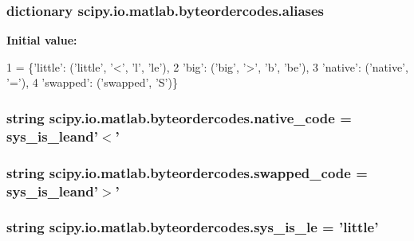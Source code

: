 \subsubsection[{aliases}]{\setlength{\rightskip}{0pt plus 5cm}dictionary scipy.\+io.\+matlab.\+byteordercodes.\+aliases}\label{namespacescipy_1_1io_1_1matlab_1_1byteordercodes_a910ab30880606690c14a385c87d8d3cb}
{\bfseries Initial value\+:}
\begin{DoxyCode}
1 = \{\textcolor{stringliteral}{'little'}: (\textcolor{stringliteral}{'little'}, \textcolor{stringliteral}{'<'}, \textcolor{stringliteral}{'l'}, \textcolor{stringliteral}{'le'}),
2            \textcolor{stringliteral}{'big'}: (\textcolor{stringliteral}{'big'}, \textcolor{stringliteral}{'>'}, \textcolor{stringliteral}{'b'}, \textcolor{stringliteral}{'be'}),
3            \textcolor{stringliteral}{'native'}: (\textcolor{stringliteral}{'native'}, \textcolor{stringliteral}{'='}),
4            \textcolor{stringliteral}{'swapped'}: (\textcolor{stringliteral}{'swapped'}, \textcolor{stringliteral}{'S'})\}
\end{DoxyCode}
\hypertarget{namespacescipy_1_1io_1_1matlab_1_1byteordercodes_a85c3d9d0b8f0e6a10e799dcfe42b2601}{}
\subsubsection[{native\+\_\+code}]{\setlength{\rightskip}{0pt plus 5cm}string scipy.\+io.\+matlab.\+byteordercodes.\+native\+\_\+code = sys\+\_\+is\+\_\+leand'$<$'}\label{namespacescipy_1_1io_1_1matlab_1_1byteordercodes_a85c3d9d0b8f0e6a10e799dcfe42b2601}
\hypertarget{namespacescipy_1_1io_1_1matlab_1_1byteordercodes_a04cd55b4d02ecf384bc66b1934dd7079}{}
\subsubsection[{swapped\+\_\+code}]{\setlength{\rightskip}{0pt plus 5cm}string scipy.\+io.\+matlab.\+byteordercodes.\+swapped\+\_\+code = sys\+\_\+is\+\_\+leand'$>$'}\label{namespacescipy_1_1io_1_1matlab_1_1byteordercodes_a04cd55b4d02ecf384bc66b1934dd7079}
\hypertarget{namespacescipy_1_1io_1_1matlab_1_1byteordercodes_a33a2864049162c99adff6bfdd3f9561f}{}
\subsubsection[{sys\+\_\+is\+\_\+le}]{\setlength{\rightskip}{0pt plus 5cm}string scipy.\+io.\+matlab.\+byteordercodes.\+sys\+\_\+is\+\_\+le = 'little'}\label{namespacescipy_1_1io_1_1matlab_1_1byteordercodes_a33a2864049162c99adff6bfdd3f9561f}
